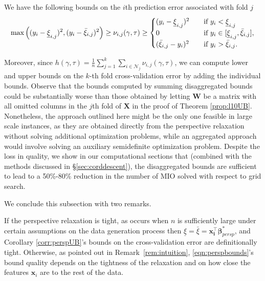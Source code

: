 \documentclass[mnsc,nonblindrev]{informs3} %
\newcommand{\ag}[1]{{\color{black}#1}}
\begin{document}
\begin{corollary}\label{corr:perspUB}
	We have the following bounds on the $i$th prediction error \ag{associated with fold $j$}
	\begin{align}\label{eqn:perspbounds}
		\max\left((y_i-\underline{\xi}_{i,j})^2, (y_i-\bar{\xi}_{i,j})^2\right) \geq \ag{\nu_{i,j}(\gamma, \tau)} \geq \begin{cases} (y_i-\underline{\xi}_{i,j})^2 \quad & \text{if} \ y_i < \underline{\xi}_{i,j}\\
			0 \quad & \text{if} \ y_i \in [\underline{\xi}_{i,j}, \bar{\xi}_{i,j}],\\
			(\bar{\xi}_{i,j}-y_i)^2 \quad & \text{if} \ y_i > \bar{\xi}_{i,j}.
		\end{cases}
	\end{align}
\end{corollary}
Moreover, since $h(\gamma,\tau)=\frac{1}{n}\sum_{j=1}^k\sum_{i\in \mathcal{N}_j}\nu_{i,j}(\gamma,\tau)$, we can compute lower and upper bounds on the $k$-th fold cross-validation error \ag{by adding the individual bounds. Observe that the bounds computed by summing disaggregated bounds could be substantially worse than those obtained by letting $\bm{W}$ be a matrix with all omitted columns in the $j$th fold of $\bm{X}$ in the proof of Theorem \ref{prop:l10UB}. Nonetheless, the approach outlined here might be the only one feasible in large scale instances, as they are obtained directly from the perspective relaxation without solving additional optimization problems, while an aggregated approach would involve solving an auxiliary semidefinite optimization problem. Despite the loss in quality, we show in our computational sections that (combined with the methods discussed in \S\ref{sec:corddescent}), the disaggregated bounds are sufficient to lead to a 50\%-80\% reduction in the number of MIO solved with respect to grid search.}

We conclude this subsection with two remarks.

\begin{remark}
	If the perspective relaxation is tight, as occurs 
 when $n$ is sufficiently large under certain assumptions on the data generation process \citep{pilanci2015sparse, reeves2019all}
 then 	$\underline{\xi}=\bar{\xi}=\bm{x_i^\top}\bm{\beta}_{persp}^*$, and Corollary \ref{corr:perspUB}'s bounds on the cross-validation error are definitionally tight. Otherwise, as pointed out in Remark~\ref{rem:intuition}, \eqref{eqn:perspbounds}'s bound quality depends on the tightness of the relaxation and on how close the features $\bm{x}_i$ are to the rest of the data. 
\end{remark}
\end{document}
